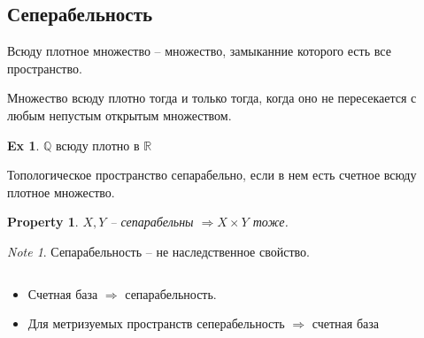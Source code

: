 \documentclass[11pt]{book}
\newcommand{\R}{\mathbb{R}}
\newcommand{\Q}{\mathbb{Q}}
\theoremstyle{definition}
\theoremstyle{plain}
\theoremstyle{plain}
\newtheorem*{prop}{Property}
\theoremstyle{definition}
\newtheorem*{ex}{Ex}
\theoremstyle{remark}
\newtheorem*{note}{Note}
\begin{document}
\subsection{Сеперабельность}
\begin{defn}
    Всюду плотное множество -- множество, замыканние которого есть все пространство.
\end{defn}
\begin{defn}
    Множество всюду плотно тогда и только тогда, когда оно не пересекается с любым непустым открытым множеством.
\end{defn}
\begin{ex}
    $ \Q$ всюду плотно в $ \R$
\end{ex}
\begin{defn}
    Топологическое пространство сепарабельно, если в нем есть счетное всюду плотное множество.
\end{defn}
\begin{prop}
        $ X, Y$ -- сепарабельны $ \Longrightarrow  X \times Y$  тоже.
\end{prop}
\begin{note}
    Сепарабельность -- не наследственное свойство.
\end{note}
\begin{thm}$ $
    \begin{itemize}
        \item Счетная база $ \Longrightarrow  $ сепарабельность.
	\item Для метризуемых пространств сеперабельность $\Longrightarrow$ счетная база
	\end{itemize}
\end{thm}
\end{document}
